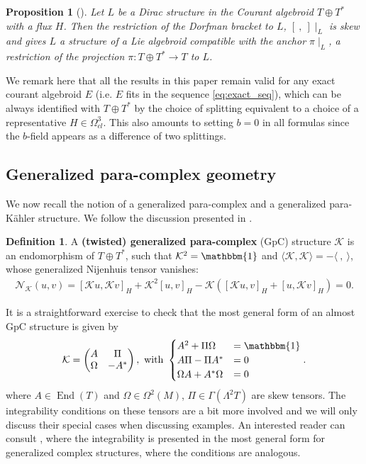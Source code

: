 \documentclass[letterpaper,12pt]{article}
\newcommand{\TT}{{T\oplus T^*}}
\newcommand{\KK}{\mathcal{K}}
\newcommand{\id}{\mathbbm{1}}
\newcommand{\se}{\Gamma}
\newcommand{\la}{\langle}
\newcommand{\ra}{\rangle}
\newcommand{\lara}{\la\ ,\ \ra}
\newcommand{\brac}{[\ ,\ ]}
\newtheorem{proposition}[theorem]{Proposition}
\theoremstyle{definition}
\newtheorem{Def}[theorem]{Definition}
\theoremstyle{remark}
\theoremstyle{examples}
\DeclareMathOperator{\End}{End}
\begin{document}
\begin{proposition}[\cite{courant1990dirac}]\label{prop:dirac_Liealg}
Let $L$ be a Dirac structure in the Courant algebroid $\TT$ with a flux $H$. Then the restriction of the Dorfman bracket to $L$, $\brac\mid_L$ is skew and gives $L$ a structure of a Lie algebroid compatible with the anchor $\pi\mid_L$, a restriction of the projection $\pi:\TT\rightarrow T$ to $L$.
\end{proposition} 
 
 
We remark here that all the results in this paper remain valid for any exact courant algebroid $E$ (i.e. $E$ fits in the sequence \eqref{eq:exact_seq}), which can be always identified with $\TT$ by the choice of splitting equivalent to a choice of a representative $H\in\Omega^3_{cl}$. This also amounts to setting $b=0$ in all formulas since the $b$-field appears as a difference of two splittings.

\subsection{Generalized para-complex geometry}
We now recall the notion of a generalized para-complex \cite{wade2004dirac,Zabzine:2006uz,Hu:2019zro} and a generalized para-K\"ahler \cite{Hu:2019zro} structure. We follow the discussion presented in \cite{Hu:2019zro}.

\begin{Def}
A \textbf{(twisted) generalized para-complex} (GpC) structure $\KK$ is an endomorphism of $\TT$, such that $\KK^2=\id$ and $\la\KK,\KK\ra=-\lara$, whose generalized Nijenhuis tensor vanishes:
\begin{align}\label{eq:gen_nijenhuis}
\mathcal{N}_\KK(u,v)=[\KK u,\KK v]_H+\KK^2[ u,v]_H-\KK([\KK u,v]_H+[ u,\KK v]_H)=0.
\end{align}
\end{Def}

It is a straightforward exercise to check that the most general form of an almost GpC structure is given by
\begin{align}\label{eq:GpC_generalform}
 \KK =
 \begin{pmatrix}
 A & \Pi \\
 \Omega & -A^*
 \end{pmatrix}, \text{ with }
 \begin{cases}
  A^2 + \Pi \Omega & = \id\\
  A\Pi - \Pi A^* & = 0\\
  \Omega A + A^*\Omega & = 0
 \end{cases}.
\end{align}
where $A \in \End(T)$ and $\Omega \in \Omega^2(M)$, $\Pi \in \se(\Lambda^2 T)$ are skew tensors. The integrability conditions on these tensors are a bit more involved and we will only discuss their special cases when discussing examples. An interested reader can consult \cite{crainic-integrability}, where the integrability is presented in the most general form for generalized complex structures, where the conditions are analogous.
\end{document}

